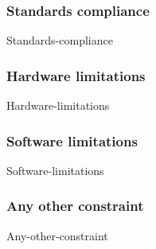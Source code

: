 \subsubsection{Standards compliance}
{Standards-compliance}

\subsubsection{Hardware	limitations}
{Hardware-limitations}

\subsubsection{Software limitations}
{Software-limitations}

\subsubsection{Any other constraint}
{Any-other-constraint}